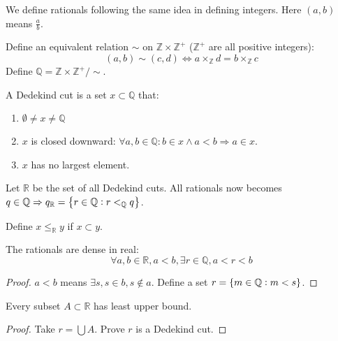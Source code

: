\begin{definition}[rationals]
    We define rationals following the same idea in defining integers. Here $(a,b)$ means $\frac{a}{b}$.
    
    Define an equivalent relation $\sim$ on $\mathbb{Z} \times \mathbb{Z}^+$ ($\mathbb{Z}^+$ are all positive integers): 
\begin{equation}
    (a,b) \sim (c,d) \Leftrightarrow a \times_\mathbb{Z} d = b \times_\mathbb{Z} c
\end{equation}
Define $\mathbb{Q} = \mathbb{Z} \times \mathbb{Z}^{+} / \sim$.    
\end{definition}

\begin{definition}
    A Dedekind cut is a set $x \subset \mathbb{Q}$ that:
    \begin{enumerate}
        \item $\emptyset \neq x \neq \mathbb{Q}$
        \item $x$ is closed downward: $\forall a,b \in \mathbb{Q}: b \in x \wedge a < b \Rightarrow a \in x $.
        \item $x$ has no largest element.
    \end{enumerate}
\end{definition}

Let $\mathbb{R}$ be the set of all Dedekind cuts. All rationals now becomes $q \in \mathbb{Q} \Rightarrow q_\mathbb{R} = \set{r \in \mathbb{Q}: r <_\mathbb{Q} q }$.

Define $x \leq_\mathbb{R} y$ if $x \subset y$.

\begin{theorem}
    The rationals are dense in real:
    \begin{equation}
        \forall a,b \in \mathbb{R}, a < b, \exists r \in \mathbb{Q}, a < r < b
    \end{equation}
\end{theorem}
\begin{proof}
    $a < b$ means $\exists s, s \in b, s \notin a$. Define a set $r = \set{m \in \mathbb{Q}: m < s}$.
\end{proof}

\begin{theorem}
    Every subset $A \subset \mathbb{R}$ has least upper bound.    
\end{theorem}
\begin{proof}
    Take $r = \bigcup A$. Prove $r$ is a Dedekind cut.
\end{proof}






